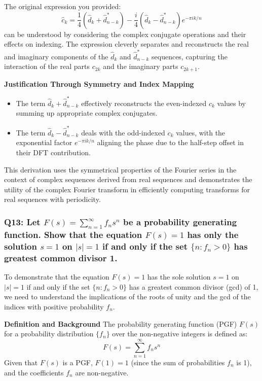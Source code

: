 \documentclass[8pt]{article}
\begin{document}
The original expression you provided:
\[
\hat{c}_k = \frac{1}{4} \left( \hat{d}_k + \hat{d}^*_{n-k} \right) - \frac{i}{4} \left( \hat{d}_k - \hat{d}^*_{n-k} \right) e^{-\pi i k / n}
\]
can be understood by considering the complex conjugate operations and their effects on indexing. The expression cleverly separates and reconstructs the real and imaginary components of the \(\hat{d}_k\) and \(\hat{d}^*_{n-k}\) sequences, capturing the interaction of the real parts \(c_{2k}\) and the imaginary parts \(c_{2k+1}\).

\textbf{Justification Through Symmetry and Index Mapping}
\begin{itemize}
    \item The term \(\hat{d}_k + \hat{d}^*_{n-k}\) effectively reconstructs the even-indexed \(c_k\) values by summing up appropriate complex conjugates.
    \item The term \(\hat{d}_k - \hat{d}^*_{n-k}\) deals with the odd-indexed \(c_k\) values, with the exponential factor \(e^{-\pi i k / n}\) aligning the phase due to the half-step offset in their DFT contribution.
\end{itemize}

This derivation uses the symmetrical properties of the Fourier series in the context of complex sequences derived from real sequences and demonstrates the utility of the complex Fourier transform in efficiently computing transforms for real sequences with periodicity.

\subsubsection*{Q13:
Let \(F(s) = \sum_{n=1}^{\infty} f_n s^n\) be a probability generating function. Show that the equation \(F(s) = 1\) has only the solution \(s = 1\) on \(|s| = 1\) if and only if the set \(\{ n : f_n > 0 \}\) has greatest common divisor 1.}

To demonstrate that the equation \( F(s) = 1 \) has the sole solution \( s = 1 \) on \( |s| = 1 \) if and only if the set \( \{ n : f_n > 0 \} \) has a greatest common divisor (gcd) of 1, we need to understand the implications of the roots of unity and the gcd of the indices with positive probability \( f_n \).

\textbf{Definition and Background}
The probability generating function (PGF) \( F(s) \) for a probability distribution \( \{f_n\} \) over the non-negative integers is defined as:
\[
F(s) = \sum_{n=1}^{\infty} f_n s^n
\]
Given that \( F(s) \) is a PGF, \( F(1) = 1 \) (since the sum of probabilities \( f_n \) is 1), and the coefficients \( f_n \) are non-negative.
\end{document}
